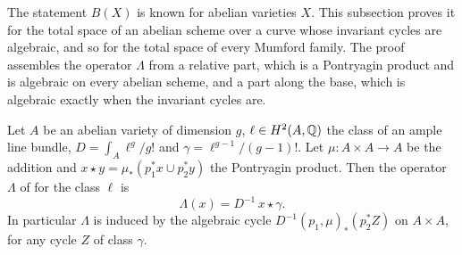 The statement $B(X)$ is known for abelian varieties $X$. This subsection
proves it for the total space
of an abelian scheme over a curve whose invariant cycles are algebraic, and
so for the total space of every Mumford family. The proof assembles the
operator $\Lambda$ from a relative part, which is a Pontryagin product and is
algebraic on every abelian scheme, and a part along the base, which is
algebraic exactly when the invariant cycles are.

\begin{proposition}
\label{prop:pontryaginlambda}
Let $A$ be an abelian variety of dimension $g$, $\ell\in H^{2}(A,\mathbb{Q})$ the
class of an ample line bundle, $D=\int_{A}\ell^{g}/g!$ and
$\gamma=\ell^{g-1}/(g-1)!$. Let $\mu\colon A\times A\to A$ be the addition
and $x\star y=\mu_{*}(p_{1}^{*}x\cup p_{2}^{*}y)$ the Pontryagin product.
Then the operator $\Lambda$ of  for the class $\ell$ is
\[
  \Lambda(x)=D^{-1}\,x\star\gamma .
\]
In particular $\Lambda$ is induced by the algebraic cycle
$D^{-1}(p_{1},\mu)_{*}(p_{2}^{*}Z)$ on $A\times A$, for any cycle $Z$ of
class $\gamma$.
\end{proposition}

